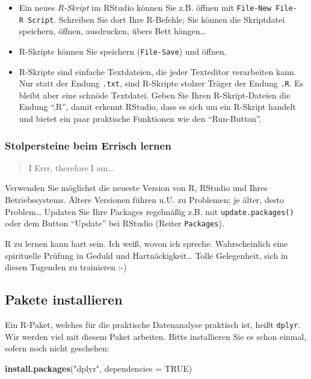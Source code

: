 \documentclass[12pt,ngerman,]{book}
\newenvironment{Shaded}{\begin{snugshade}}{\end{snugshade}}
\newcommand{\KeywordTok}[1]{\textcolor[rgb]{0.13,0.29,0.53}{\textbf{{#1}}}}
\newcommand{\DataTypeTok}[1]{\textcolor[rgb]{0.13,0.29,0.53}{{#1}}}
\newcommand{\StringTok}[1]{\textcolor[rgb]{0.31,0.60,0.02}{{#1}}}
\newcommand{\OtherTok}[1]{\textcolor[rgb]{0.56,0.35,0.01}{{#1}}}
\newcommand{\NormalTok}[1]{{#1}}
\renewenvironment{Shaded}{\begin{kframe}}{\end{kframe}}
\begin{document}
\begin{itemize}
\item
  Ein neues \emph{R-Skript} im RStudio können Sie z.B.
  öffnen mit \texttt{File-New\ File-R\ Script}. Schreiben Sie dort Ihre
  R-Befehle; Sie können die Skriptdatei speichern, öffnen, ausdrucken,
  übers Bett hängen\ldots{}
\item
  R-Skripte können Sie speichern (\texttt{File-Save}) und öffnen.
\item
  R-Skripte sind einfache Textdateien, die jeder Texteditor verarbeiten
  kann. Nur statt der Endung \texttt{.txt}, sind R-Skripte stolzer
  Träger der Endung \texttt{.R}. Es bleibt aber eine schnöde Textdatei.
  Geben Sie Ihren R-Skript-Dateien die Endung ``.R'', damit erkennt
  RStudio, dass es sich um ein R-Skript handelt und bietet ein paar
  praktische Funktionen wie den ``Run-Button''.
\end{itemize}

\subsubsection{Stolpersteine beim Errisch
lernen}\label{stolpersteine-beim-errisch-lernen}

\begin{quote}
I Errr, therefore I am\ldots{}
\end{quote}

Verwenden Sie möglichst die neueste Version von R, RStudio und Ihres
Betriebssystems. Ältere Versionen führen u.U. zu Problemen; je älter,
desto Problem\ldots{} Updaten Sie Ihre Packages regelmäßig z.B. mit
\texttt{update.packages()} oder dem Button ``Update'' bei RStudio
(Reiter \texttt{Packages}).

R zu lernen kann hart sein. Ich weiß, wovon ich spreche. Wahrscheinlich
eine spirituelle Prüfung in Geduld und Hartnäckigkeit\ldots{} Tolle
Gelegenheit, sich in diesen Tugenden zu trainieren :-)

\subsection{Pakete installieren}\label{pakete-installieren}

Ein R-Paket, welches für die praktische Datenanalyse praktisch ist,
heißt \texttt{dplyr}. Wir werden viel mit diesem Paket arbeiten. Bitte
installieren Sie es schon einmal, sofern noch nicht geschehen:

\begin{Shaded}
\begin{Highlighting}[]
\KeywordTok{install.packages}\NormalTok{(}\StringTok{"dplyr"}\NormalTok{, }\DataTypeTok{dependencies =} \OtherTok{TRUE}\NormalTok{) }
\end{Highlighting}
\end{Shaded}
\end{document}
